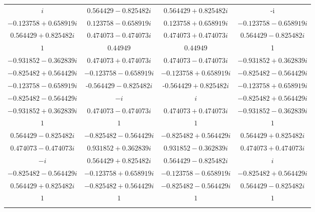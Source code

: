 \documentclass[pdflatex,sn-mathphys-num]{sn-jnl}%
\theoremstyle{thmstyleone}%
\theoremstyle{thmstyletwo}%
\theoremstyle{thmstylethree}%
\begin{document}
\begin{table}
\begin{tabular}{c|c|c|c}
        $i$                              & $0.564429 - 0.825482 i$  & $0.564429 + 0.825482 i$    & -i \\
        $-0.123758 + 0.658919 i$         & $0.123758 - 0.658919 i$  & $0.123758 + 0.658919 i$    & $-0.123758 - 0.658919 i$ \\
        $0.564429 + 0.825482 i$          & $0.474073 - 0.474073 i$  & $0.474073 + 0.474073 i$    & $0.564429 - 0.825482 i$ \\
        $1$                              & $0.44949$                & $0.44949$                  & 1 \\
        $-0.931852 - 0.362839 i$         & $0.474073 + 0.474073 i$  & $0.474073 - 0.474073 i$    & $-0.931852 + 0.362839 i$ \\
        $-0.825482 + 0.564429 i$         & $-0.123758 - 0.658919 i$ & $-0.123758 + 0.658919 i$   & $-0.825482 - 0.564429 i$ \\
        $-0.123758 - 0.658919 i$         & -$0.564429 - 0.825482 i$ & -$0.564429 + 0.825482 i$   & $-0.123758 + 0.658919 i$ \\ 
        $-0.825482 - 0.564429 i$         & $-i$                     & $i$                        & $-0.825482 + 0.564429 i$ \\                 
        $-0.931852 + 0.362839 i$         & $0.474073 - 0.474073 i$  & $0.474073 + 0.474073 i$    & $-0.931852 - 0.362839 i$ \\                 
        $1$                              & $1$                      & $1$                        & $1$ \\                 
        $0.564429 - 0.825482 i$          & $-0.825482 - 0.564429 i$ & $-0.825482 + 0.564429 i$   & $0.564429 + 0.825482 i$ \\                 
        $0.474073 - 0.474073 i$          & $0.931852 + 0.362839 i$  & $0.931852 - 0.362839 i$    & $0.474073 + 0.474073 i$ \\                 
        $-i$                             & $0.564429 + 0.825482 i$  & $0.564429 - 0.825482 i$    & $i$ \\                 
        $-0.825482 - 0.564429 i$         & $-0.123758 + 0.658919 i$ & $-0.123758 - 0.658919 i$   & $-0.825482 + 0.564429 i$ \\                 
        $0.564429 + 0.825482 i$          & $-0.825482 + 0.564429 i$ & $-0.825482 - 0.564429 i$   & $0.564429 - 0.825482 i$ \\                 
        $1$                              & $1$                      & $1$                        & $1$ \\
        \botrule                 
    \end{tabular}
    
\end{table}
\end{document}
